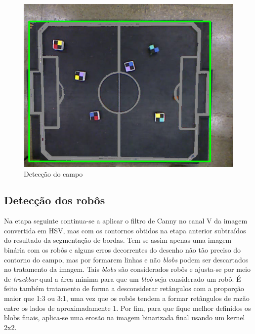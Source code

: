 \documentclass[conference, harvard, brazil, english]{sbatex}
\begin{document}
		\begin{figure}[h]
			\centering
			\includegraphics[scale=0.3]{field_detection}
			\caption{Detecção do campo}
		\end{figure}
		\subsection{Detecção dos robôs}
		\par Na etapa seguinte continua-se a aplicar o filtro de Canny no canal V da imagem convertida em HSV, mas com os contornos obtidos na etapa anterior subtraídos do resultado da segmentação de bordas. Tem-se assim apenas uma imagem binária com os robôs e alguns erros decorrentes do desenho não tão preciso do contorno do campo, mas por formarem linhas e não \textit{blobs} podem ser descartados no tratamento da imagem. Tais \textit{blobs} são considerados robôs e ajusta-se por meio de \textit{trackbar} qual a área minima para que um \textit{blob} seja considerado um robô. É feito também tratamento de forma a desconsiderar retângulos com a proporção maior que 1:3 ou 3:1, uma vez que os robôs tendem a formar retângulos de razão entre os lados de aproximadamente 1. Por fim, para que fique melhor definidos os blobs finais, aplica-se uma erosão na imagem binarizada final usando um kernel 2x2.
		
\end{document}
